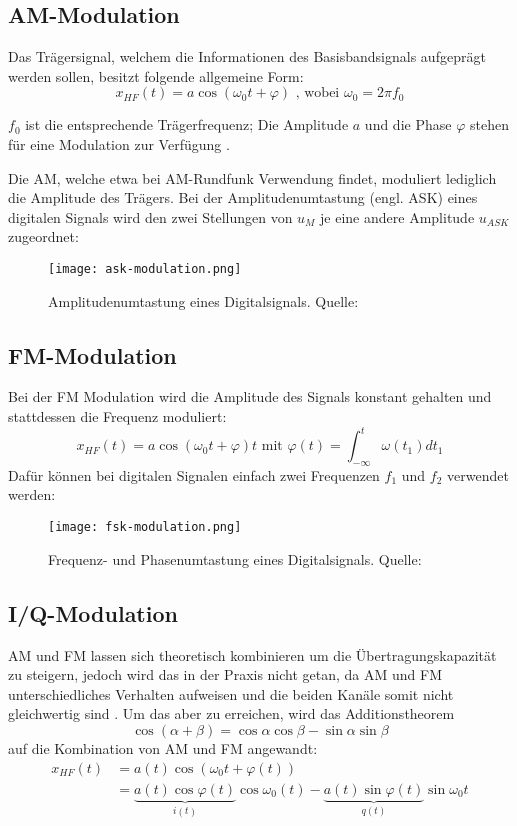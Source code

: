 \subsection{AM-Modulation}
Das Trägersignal, welchem die Informationen des Basisbandsignals aufgeprägt werden sollen, besitzt folgende allgemeine Form:
\[ x_{HF} (t) = a \cos(\omega_0t + \varphi) \text{ , wobei }\omega_0 = 2\pi f_0 \]

\(f_0\) ist die entsprechende Trägerfrequenz; Die Amplitude \(a\) und die Phase \(\varphi\) stehen für eine Modulation zur Verfügung \cite[vgl. Heuberger, e. a., S. 39]{Heuberger:2017}.

Die \ac{AM}, welche etwa bei AM-Rundfunk Verwendung findet, moduliert lediglich die Amplitude des Trägers. Bei der Amplitudenumtastung (engl. \ac{ASK}) eines digitalen Signals wird den zwei Stellungen von \(u_M\) je eine andere Amplitude \(u_{ASK}\) zugeordnet:

\begin{figure}[ht]
	\centering
	\texttt{[image: ask-modulation.png]}
	\caption[Amplitudenumtastung eines Digitalsignals]{Amplitudenumtastung eines Digitalsignals. Quelle: \cite[Plaßmann, S. 1218]{Plassmann:2016}} 
	\label{ask}
\end{figure}



\subsection{FM-Modulation}
Bei der FM Modulation wird die Amplitude des Signals konstant gehalten und stattdessen die Frequenz moduliert:
\[ x_{HF}(t) = a \cos (\omega_0 t + \varphi)t  \text{  mit } \varphi(t) = \int_{- \infty}^{t} \omega(t_1) dt_1\] 
Dafür können bei digitalen Signalen einfach zwei Frequenzen \(f_1\) und \(f_2\) verwendet werden:
\begin{figure}[ht]
	\centering
	\texttt{[image: fsk-modulation.png]}
	\caption[Frequenz- und Phasenumtastung eines Digitalsignals]{Frequenz- und Phasenumtastung eines Digitalsignals. Quelle: \cite[Plaßmann, S. 1218]{Plassmann:2016}} 
	\label{fsk}
\end{figure}



\subsection{I/Q-Modulation}
\ac{AM} und \ac{FM} lassen sich theoretisch kombinieren um die Übertragungskapazität zu steigern, jedoch wird das in der Praxis nicht getan, da AM und FM unterschiedliches Verhalten aufweisen und die beiden Kanäle somit nicht gleichwertig sind \cite[vgl. Heuberger, e. a., S. 40]{Heuberger:2017}. Um das aber zu erreichen, wird das Additionstheorem 
\[ \cos (\alpha + \beta) = \cos \alpha \cos \beta - \sin \alpha \sin \beta\] 
auf die Kombination von AM und FM angewandt:
\begin{align*}
	x_{HF}(t) &= a(t) \cos (\omega_0 t + \varphi(t)) \\
			  &= \underbrace{a(t) \cos \varphi(t)}_{i(t)} \cos \omega_0(t) - \underbrace{a(t) \sin \varphi(t)}_{q(t)} \sin \omega_0t
\end{align*}

